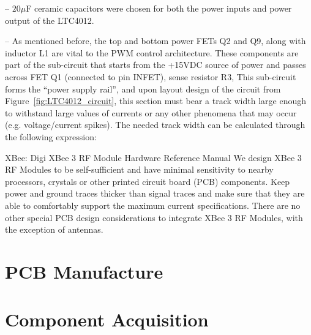 


-- $20 \mu$F ceramic capacitors were chosen for both the power inputs and power output of the LTC4012. 

-- As mentioned before, the top and bottom power FETs Q2 and Q9, along with inductor L1 are vital to the PWM control architecture. These components are part of the sub-circuit that starts from the +15VDC source of power and passes across FET Q1 (connected to pin INFET), sense resistor R3, 
This sub-circuit forms the ``power supply rail'', and upon layout design of the circuit from Figure~\ref{fig:LTC4012_circuit}, this section must bear a track width large enough to withstand large values of currents or any other phenomena that may occur (e.g. voltage/current spikes). The needed track width can be calculated through the following expression:

XBee: Digi XBee 3 RF Module Hardware Reference Manual
We design XBee 3 RF Modules to be self-sufficient and have minimal sensitivity to nearby processors,
crystals or other printed circuit board (PCB) components. Keep power and ground traces thicker than
signal traces and make sure that they are able to comfortably support the maximum current
specifications. There are no other special PCB design considerations to integrate XBee 3 RF Modules,
with the exception of antennas.

\section{PCB Manufacture}\label{sec:51_PCBmanufacture}

\section{Component Acquisition}\label{sec:52_ComponentAcquisition}


